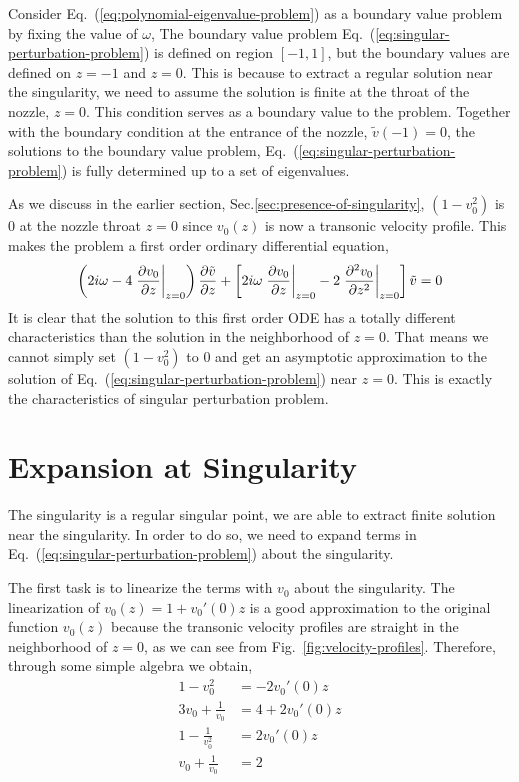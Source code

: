 Consider Eq.~(\ref{eq:polynomial-eigenvalue-problem}) as a boundary value problem by fixing the value of $\omega$,
The boundary value problem Eq.~(\ref{eq:singular-perturbation-problem}) is defined on region $[-1,1]$, but the boundary values are defined on $z=-1$ and $z=0$. This is because to extract a regular solution near the singularity, we need to assume the solution is finite at the throat of the nozzle, $z=0$. This condition serves as a boundary value to the problem. Together with the boundary condition at the entrance of the nozzle, $\tilde{v}(-1) = 0$, the solutions to the boundary value problem, Eq.~(\ref{eq:singular-perturbation-problem}) is fully determined up to a set of eigenvalues.

As we discuss in the earlier section, Sec.\ref{sec:presence-of-singularity}, $(1-v_0^2)$ is 0 at the nozzle throat $z=0$ since $v_0(z)$ is now a transonic velocity profile. This makes the problem a first order ordinary differential equation,
\[
	\left( 2i\omega - 4\eval{\pdv{v_0}{z}}_{z=0} \right)\pdv{\tilde{v}}{z}
	+ \left[2i\omega\eval{\pdv{v_0}{z}}_{z=0} - 2\eval{\pdv[2]{v_0}{z}}_{z=0} \right]\tilde{v}  = 0
\]
It is clear that the solution to this first order ODE has a totally different characteristics than the solution in the neighborhood of $z=0$. That means we cannot simply set $(1-v_0^2)$ to 0 and get an asymptotic approximation to the solution of Eq.~(\ref{eq:singular-perturbation-problem}) near $z=0$. This is exactly the characteristics of singular perturbation problem.

\section{Expansion at Singularity}
The singularity is a regular singular point, we are able to extract finite solution near the singularity. In order to do so, we need to expand terms in Eq.~(\ref{eq:singular-perturbation-problem}) about the singularity.

The first task is to linearize the terms with $v_0$ about the singularity. The linearization of $v_0(z) = 1 + v_0'(0)z$ is a good approximation to the original function $v_0(z)$ because the transonic velocity profiles are straight in the neighborhood of $z=0$, as we can see from Fig.~\ref{fig:velocity-profiles}. Therefore, through some simple algebra we obtain,
\begin{equation}
	\begin{aligned}
		1-v_0^2              & = -2v_0'(0)z    \\
		3v_0 + \frac{1}{v_0} & = 4 + 2v_0'(0)z \\
		1-\frac{1}{v_0^2}    & = 2v_0'(0)z     \\
		v_0 + \frac{1}{v_0}  & = 2
	\end{aligned}
\end{equation}

